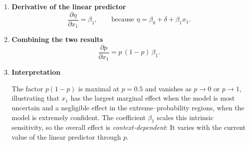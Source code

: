 {\begin{enumerate}[a)]
\begin{enumerate}[(i)]
\begin{enumerate}
            We aim to compute its derivative with respect to \( \eta \):
            \[
            \frac{d}{d\eta} \left( \frac{1}{1 + e^{-\eta}} \right).
            \]
            
            Rewriting using the power rule:
            \[
            \sigma(\eta) = (1 + e^{-\eta})^{-1},
            \]
            so by the chain rule:
            \[
            \frac{d\sigma}{d\eta}
              = -1 \cdot (1 + e^{-\eta})^{-2} \cdot \frac{d}{d\eta}(1 + e^{-\eta})
              = \frac{e^{-\eta}}{(1 + e^{-\eta})^2}.
            \]
            
            To express this in terms of \( \sigma(\eta) \), note:
            \[
            \sigma(\eta) = \frac{1}{1 + e^{-\eta}},
            \quad\text{and}\quad
            1 - \sigma(\eta) = \frac{e^{-\eta}}{1 + e^{-\eta}}.
            \]
            
            Hence:
            \[
            \sigma(\eta)\,(1 - \sigma(\eta)) = \frac{1}{1 + e^{-\eta}} \cdot \frac{e^{-\eta}}{1 + e^{-\eta}} = \frac{e^{-\eta}}{(1 + e^{-\eta})^2}.
            \]
            
            So the derivative simplifies to:
            \[
            \frac{\partial p}{\partial \eta}
              = \frac{d\sigma}{d\eta}
              = \sigma(\eta)\,(1 - \sigma(\eta))
              = p\,(1 - p).
            \]
            
            \item \textbf{Derivative of the linear predictor}
            \[
            \frac{\partial \eta}{\partial x_{1}}
              =\beta_{1},
            \qquad
            \text{because } \eta=\beta_{0}+\delta+\beta_{1}x_{1}.
            \]
            
            \item \textbf{Combining the two results}
            \[
            \boxed{\displaystyle
              \frac{\partial p}{\partial x_{1}}
                = p\,(1-p)\,\beta_{1}} .
            \]
            
            \item \textbf{Interpretation}
            
            The factor \(p(1-p)\) is maximal at \(p=0.5\) and vanishes as \(p\to0\) or \(p\to1\), illustrating that \(x_{1}\) has the largest marginal effect when the model is most uncertain and a negligible effect in the extreme–probability regions, when the model is extremely confident.
            The coefficient
            \(\beta_{1}\) scales this intrinsic sensitivity, so the overall effect is
            \emph{context‐dependent}: It varies with the current value of the linear predictor
            through \(p\).
        \end{enumerate}
        

\end{enumerate}
\end{enumerate}}
